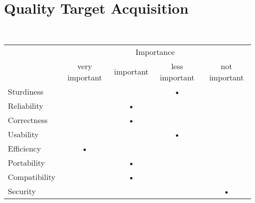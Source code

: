 \section{Quality Target Acquisition}

~\\

\begin{center}
	
	\begin{tabular}{lcccc}
		
		\cline{2-5}
		& \multicolumn{4}{c}{Importance} \\
		\cline{2-5}
			 & very important & important & less important & not important \\
		\hline \hline
		
		\multicolumn{1}{l||}{Sturdiness} & & & \textbf{•} & \\ \hline
		\multicolumn{1}{l||}{Reliability} & &\textbf{•} & &  \\ \hline
		\multicolumn{1}{l||}{Correctness} & & \textbf{•}& &  \\ \hline
		\multicolumn{1}{l||}{Usability} & & &\textbf{•} &  \\ \hline
		\multicolumn{1}{l||}{Efficiency} &\textbf{•} & & &  \\ \hline
		\multicolumn{1}{l||}{Portability} & &\textbf{•} & &  \\ \hline
		\multicolumn{1}{l||}{Compatibility} & & \textbf{•}& &  \\ \hline
		\multicolumn{1}{l||}{Security} & & & & \textbf{•} \\ 
		
		\hline \hline
	
	\end{tabular}
	
\end{center}